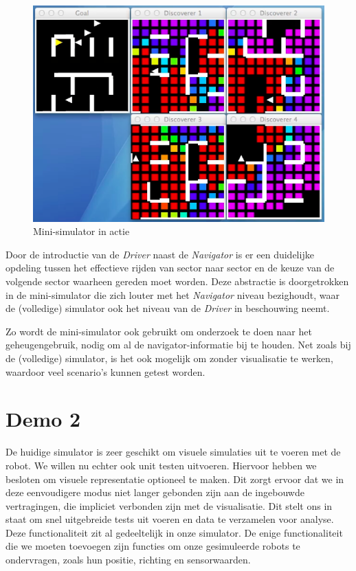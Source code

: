 \documentclass[12pt,a4paper]{report}
\begin{document}
\begin{figure}[htbp]
  \centering
  \includegraphics[width=120mm]{resources/mini-simulator.png}
  \caption{Mini-simulator in actie}
  \label{fig:mini-simulator}
\end{figure}

Door de introductie van de \emph{Driver} naast de \emph{Navigator} is er een duidelijke opdeling tussen het effectieve rijden van sector naar sector en de keuze van de volgende sector waarheen gereden moet worden. Deze abstractie is doorgetrokken in de mini-simulator die zich louter met het \emph{Navigator} niveau bezighoudt, waar de (volledige) simulator ook het niveau van de \emph{Driver} in beschouwing neemt.

Zo wordt de mini-simulator ook gebruikt om onderzoek te doen naar het geheugengebruik, nodig om al de navigator-informatie bij te houden. Net zoals bij de (volledige) simulator, is het ook mogelijk om zonder visualisatie te werken, waardoor veel scenario's kunnen getest worden.

\section{Demo 2}

De huidige simulator is zeer geschikt om visuele simulaties uit te voeren met de robot. We willen nu echter ook unit testen uitvoeren. Hiervoor hebben we besloten om visuele representatie optioneel te maken. Dit zorgt ervoor dat we in deze eenvoudigere modus niet langer gebonden zijn aan de ingebouwde vertragingen, die impliciet verbonden zijn met de visualisatie.
Dit stelt ons in staat om snel uitgebreide tests uit voeren en data te verzamelen voor analyse.
Deze functionaliteit zit al gedeeltelijk in onze simulator. De enige functionaliteit die we moeten toevoegen zijn functies om onze gesimuleerde robots te ondervragen, zoals hun positie, richting en sensorwaarden.
\end{document}
